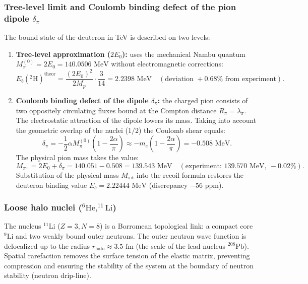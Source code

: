 \documentclass[11pt,a4paper]{article}
\providecommand{\lambdabar}{\bar{\lambda}}
\theoremstyle{definition}
\theoremstyle{remark}
\begin{document}
\subsubsection{Tree-level limit and Coulomb binding defect of the pion dipole $\delta_\pi$}

The bound state of the deuteron in TeV is described on two levels:
\begin{enumerate}
\item \textbf{Tree-level approximation ($2E_0$):} uses the mechanical Nambu quantum $M_\pi^{(0)} = 2E_0 = 140.0506\text{ MeV}$ without electromagnetic corrections:
\begin{equation}
	E_b(^2\mathrm{H})^{\mathrm{theor}} = \frac{(2E_0)^2}{2 M_p} \cdot \frac{3}{14} = 2.2398\text{ MeV} \quad (\text{deviation } +0.68\% \text{ from experiment}).
\label{eq:deuteron_tree_binding}
\end{equation}
\item \textbf{Coulomb binding defect of the dipole $\delta_\pi$:} the charged pion consists of two oppositely circulating fluxes bound at the Compton distance $R_\pi = \lambdabar_\pi$. The electrostatic attraction of the dipole lowers its mass. Taking into account the geometric overlap of the nuclei ($1/2$) the Coulomb shear equals:
\begin{equation}
	\delta_\pi = -\frac{1}{2} \alpha M_\pi^{(0)} \left(1 - \frac{2\alpha}{\pi}\right) \approx -m_e \left(1 - \frac{2\alpha}{\pi}\right) = -0.508\text{ MeV}.
\label{eq:pion_coulomb_defect_val}
\end{equation}
The physical pion mass takes the value:
\begin{equation}
	M_{\pi^\pm} = 2E_0 + \delta_\pi = 140.051 - 0.508 = 139.543\text{ MeV} \quad (\text{experiment: } 139.570\text{ MeV}, \ -0.02\%).
\label{eq:pion_dressed_mass_formula}
\end{equation}
Substitution of the physical mass $M_{\pi^\pm}$ into the recoil formula restores the deuteron binding value $E_b = 2.22444\text{ MeV}$ (discrepancy $-56\text{ ppm}$).
\end{enumerate}

\subsubsection{Loose halo nuclei ($^6\mathrm{He}, ^{11}\mathrm{Li}$)}

The nucleus $^{11}\mathrm{Li}$ ($Z=3, N=8$) is a Borromean topological link: a compact core $^9\mathrm{Li}$ and two weakly bound outer neutrons. The outer neutron wave function is delocalized up to the radius $r_{\mathrm{halo}} \approx 3.5\text{ fm}$ (the scale of the lead nucleus $^{208}\mathrm{Pb}$). Spatial rarefaction removes the surface tension of the elastic matrix, preventing compression and ensuring the stability of the system at the boundary of neutron stability (neutron drip-line).
\end{document}
